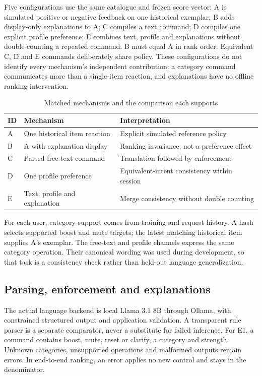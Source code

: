 \documentclass[conference]{IEEEtran}
\begin{document}
Five configurations use the same catalogue and frozen score vector: A is simulated positive or negative feedback on one historical exemplar; B adds display-only explanations to A; C compiles a text command; D compiles one explicit profile preference; E combines text, profile and explanations without double-counting a repeated command. B must equal A in rank order. Equivalent C, D and E commands deliberately share policy. These configurations do not identify every mechanism's independent contribution: a category command communicates more than a single-item reaction, and explanations have no offline ranking intervention.

\begin{table}[t]\centering\small
\caption{Matched mechanisms and the comparison each supports}
\begin{tabular}{p{0.4cm}p{2.6cm}p{3.9cm}}\toprule
ID&Mechanism&Interpretation\\\midrule
A&One historical item reaction&Explicit simulated reference policy\\
B&A with explanation display&Ranking invariance, not a preference effect\\
C&Parsed free-text command&Translation followed by enforcement\\
D&One profile preference&Equivalent-intent consistency within session\\
E&Text, profile and explanation&Merge consistency without double counting\\\bottomrule
\end{tabular}\end{table}

For each user, category support comes from training and request history. A hash selects supported boost and mute targets; the latest matching historical item supplies A's exemplar. The free-text and profile channels express the same category operation. Their canonical wording was used during development, so that task is a consistency check rather than held-out language generalization.

\subsection{Parsing, enforcement and explanations}
The actual language backend is local Llama 3.1 8B through Ollama, with constrained structured output and application validation. A transparent rule parser is a separate comparator, never a substitute for failed inference. For E1, a command contains boost, mute, reset or clarify, a category and strength. Unknown categories, unsupported operations and malformed outputs remain errors. In end-to-end ranking, an error applies no new control and stays in the denominator.
\end{document}
